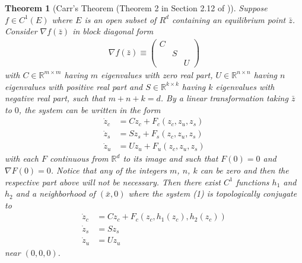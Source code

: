 \documentclass[reqno]{amsart}
\theoremstyle{plain}
\newtheorem{theorem}{Theorem}	%
\theoremstyle{definition}
\theoremstyle{remark}
\begin{document}
\begin{theorem}[Carr's Theorem (Theorem 2 in Section 2.12 of \cite{perko2013differential})]
\label{thrm:Carr}
Suppose $f \in C^{1}(E)$ where $E$ is an open subset of $R^{d}$ containing an equilibrium point $\bar{z}$.
Consider $\nabla f(\bar{z})$ in block diagonal form
\begin{align}
		\nabla f(\bar{z}) \equiv 
		 \begin{pmatrix}
			 C & & \\
			 & S & \\
			 & & U
		 \end{pmatrix}
	\end{align}
	with $C\in\mathbb{R}^{m\times m}$ having $m$ eigenvalues with zero real part, $U\in\mathbb{R}^{n\times n}$ having $n$ eigenvalues with positive real part and $S\in\mathbb{R}^{k\times k}$ having $k$ eigenvalues with negative real part, such that $m+n+k=d$. By a linear transformation taking $\bar{z}$ to $0$, the system can be written in the form 
	\begin{align}
	\dot{z}_c &= Cz_c + F_c(z_c,z_u,z_s)
	\\
	\dot{z}_s &= Sz_s + F_s(z_c,z_u,z_s)
	\\
	\dot{z}_u &= Uz_u + F_u(z_c,z_u,z_s)
	\end{align}
	with each $F$ continuous from $\mathbb{R}^{d}$ to its image and such that $F(0)=0$ and $\nabla F(0)=0$. 
    Notice that any of the integers $m$, $n$, $k$ can be zero and then the respective part above will not be necessary. 
	Then there exist $C^1$ functions $h_1$ and $h_2$ and a neighborhood of $(\bar{x},0)$ where the system (1) is topologically conjugate to 
	\begin{align}
    	\dot{z}_c &= Cz_c + F_c(z_c,h_1(z_c),h_2(z_c))
        \label{eq:linearized_c}
    	\\
    	\dot{z}_s &= Sz_s
        \label{eq:linearized_s}
    	\\
    	\dot{z}_u &= Uz_u 
        \label{eq:linearized_u}
	\end{align}
	near $(0,0,0)$.
\end{theorem}
\end{document}
